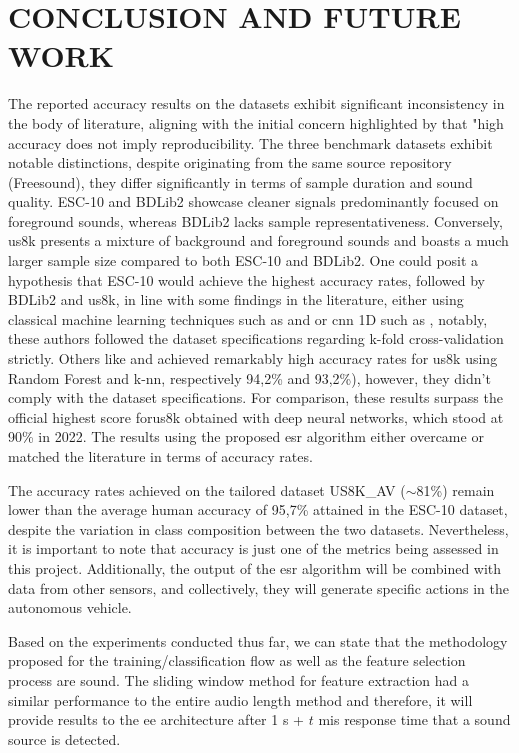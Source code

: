 \chapter{CONCLUSION AND FUTURE WORK}
\label{chp:conclusion}


The reported accuracy results on the datasets exhibit significant inconsistency in the body of literature, aligning with the initial concern highlighted by \textcite{Ho2020} that "high accuracy does not imply reproducibility. The three benchmark datasets exhibit notable distinctions, despite originating from the same source repository (Freesound), they differ significantly in terms of sample duration and sound quality. ESC-10 and BDLib2 showcase cleaner signals predominantly focused on foreground sounds, whereas BDLib2 lacks sample representativeness. Conversely, \gls{us8k} presents a mixture of background and foreground sounds and boasts a much larger sample size compared to both ESC-10 and BDLib2. One could posit a hypothesis that ESC-10 would achieve the highest accuracy rates, followed by BDLib2 and \gls{us8k}, in line with some findings in the literature, either using classical machine learning techniques such as \cite{Silva2019} and \cite{Bountourakis2019} or \gls{cnn} 1D such as \cite{Vandendriessche2021}, notably, these authors followed the dataset specifications regarding k-fold cross-validation strictly. Others like \cite{Lhoest2021} and \cite{Luz2021} achieved remarkably high accuracy rates for \gls{us8k} using Random Forest and \gls{k-nn}, respectively 94,2\% and 93,2\%), however, they didn't comply with the dataset specifications. For comparison, these results surpass the official highest score for\gls{us8k} obtained with deep neural networks, which stood at 90\% in 2022. The results using the proposed \gls{esr} algorithm either overcame or matched the literature in terms of accuracy rates.


The accuracy rates achieved on the tailored dataset US8K\_AV ($\sim$81\%) remain lower than the average human accuracy of 95,7\% attained in the ESC-10 dataset, despite the variation in class composition between the two datasets. Nevertheless, it is important to note that accuracy is just one of the metrics being assessed in this project. Additionally, the output of the \gls{esr} algorithm will be combined with data from other sensors, and collectively, they will generate specific actions in the autonomous vehicle.


Based on the experiments conducted thus far, we can state that the methodology proposed for the training/classification flow as well as the feature selection process are sound. The sliding window method for feature extraction had a similar performance to the entire audio length method and therefore, it will provide results to the \gls{ee} architecture after 1 \gls{s} + $t$ \gls{mi}\gls{s} response time that a sound source is detected.


